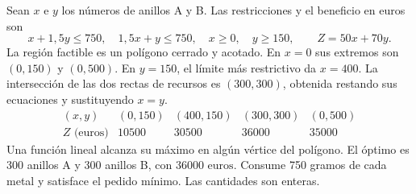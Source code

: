 Sean $x$ e $y$ los números de anillos A y B. Las restricciones y el beneficio en euros son
\[
 x+1{,}5y\le750,\quad1{,}5x+y\le750,\quad x\ge0,\quad y\ge150,
 \qquad Z=50x+70y.
\]
La región factible es un polígono cerrado y acotado. En $x=0$ sus extremos son $(0,150)$ y $(0,500)$. En $y=150$, el límite más restrictivo da $x=400$. La intersección de las dos rectas de recursos es $(300,300)$, obtenida restando sus ecuaciones y sustituyendo $x=y$.
\[
 \begin{array}{c|rrrr}
 (x,y)&(0,150)&(400,150)&(300,300)&(0,500)\\
 Z\text{ (euros)}&10500&30500&36000&35000
 \end{array}
\]
Una función lineal alcanza su máximo en algún vértice del polígono. El óptimo es 300 anillos A y 300 anillos B, con $\boxed{36000\text{ euros}}$. Consume 750 gramos de cada metal y satisface el pedido mínimo. Las cantidades son enteras.
